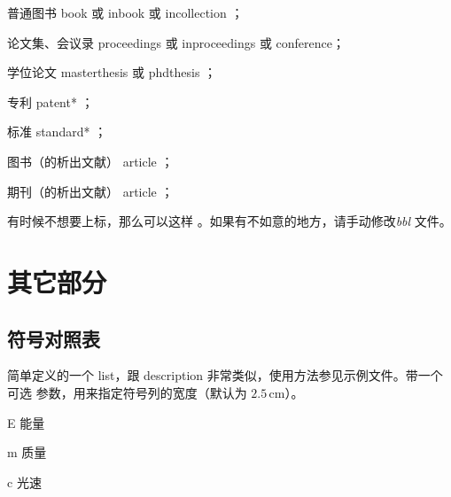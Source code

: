 
普通图书 book
\cite{cdy, hlswedl, bjszxmzhzjwyh,qgxxywxbzhjswyh,xgx, gyw, wfz, zgdylsdag, zxg, tjdxtmgcfzgjzdsys,zgzzxh,peebles,baldock,sommers}
 或 inbook 或 incollection
\cite{zhang1991, dupont1974}； %

论文集、会议录 proceedings \cite{nzm, yufin, jdq} 或 inproceedings 或 conference；


学位论文 masterthesis 或 phdthesis
\cite{mh, ding2001, cairns1965}；

专利 patent*   %
\cite{jiang1989}；

标准 standard*
\cite{gb6447}；

图书（的析出文献） article
\cite{wfz2,cgw,cjb, mks, weinstein, roberson}；

期刊（的析出文献） article
\cite{chen2001, nadkarni1992, hua1973}；





有时候不想要上标，那么可以这样 。如果有不如意的地方，请手动修改\emph{bbl} 文件。


\section{其它部分}
\label{sec:otherparts}

\subsection*{符号对照表}

简单定义的一个 list，跟 description 非常类似，使用方法参见示例文件。带一个可选
参数，用来指定符号列的宽度（默认为 $2.5\,\mathrm{cm}$）。
\begin{code}
\begin{denotation}[1.5cm]
  \item[E] 能量
  \item[m] 质量
  \item[c] 光速
\end{denotation}
\end{code}


